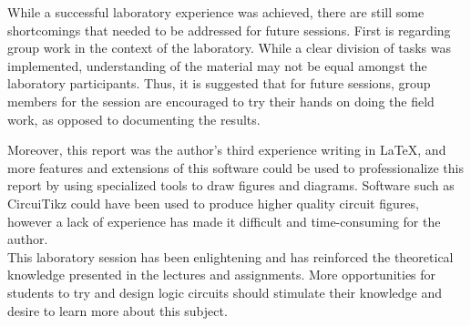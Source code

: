 \documentclass{report}
\begin{document}
	While a successful laboratory experience was achieved, there are still some shortcomings that needed to be addressed for future sessions. First is regarding group work in the context of the laboratory. While a clear division of tasks was implemented, understanding of the material may not be equal amongst the laboratory participants. Thus, it is suggested that for future sessions, group members for the session are encouraged to try their hands on doing the field work, as opposed to documenting the results. 
	
	Moreover, this report was the author's third experience writing in \LaTeX, and more features and extensions of this software could be used to professionalize this report by using specialized tools to draw figures and diagrams. Software such as CircuiTikz could have been used to produce higher quality circuit figures, however a lack of experience has made it difficult and time-consuming for the author. \\
	
	This laboratory session has been enlightening and has reinforced the theoretical knowledge presented in the lectures and assignments. More opportunities for students to try and design logic circuits should stimulate their knowledge and desire to learn more about this subject.

\printbibliography
\end{document}
